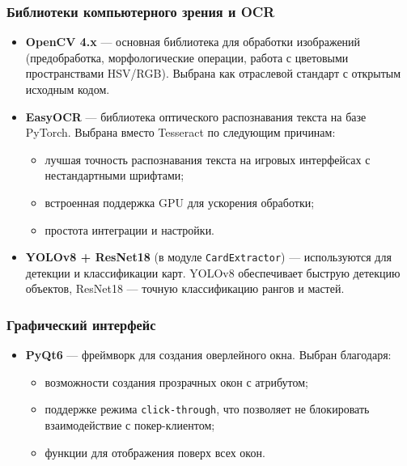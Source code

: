 \subsubsection*{Библиотеки компьютерного зрения и OCR}

\begin{itemize}
    \item \textbf{OpenCV 4.x} --- основная библиотека для обработки изображений (предобработка, морфологические операции, работа с цветовыми пространствами HSV/RGB). Выбрана как отраслевой стандарт с открытым исходным кодом.
    
    \item \textbf{EasyOCR} --- библиотека оптического распознавания текста на базе PyTorch. Выбрана вместо Tesseract по следующим причинам:
    \begin{itemize}
        \item лучшая точность распознавания текста на игровых интерфейсах с нестандартными шрифтами;
        \item встроенная поддержка GPU для ускорения обработки;
        \item простота интеграции и настройки.
    \end{itemize}
    
    \item \textbf{YOLOv8 + ResNet18} (в модуле \texttt{CardExtractor}) --- используются для детекции и классификации карт. YOLOv8 обеспечивает быструю детекцию объектов, ResNet18 --- точную классификацию рангов и мастей.
\end{itemize}

\subsubsection*{Графический интерфейс}

\begin{itemize}
    \item \textbf{PyQt6} --- фреймворк для создания оверлейного окна. Выбран благодаря:
    \begin{itemize}
        \item возможности создания прозрачных окон с атрибутом;
        \item поддержке режима \texttt{click-through}, что позволяет не блокировать взаимодействие с покер-клиентом;
        \item функции для отображения поверх всех окон.
    \end{itemize}
\end{itemize}

